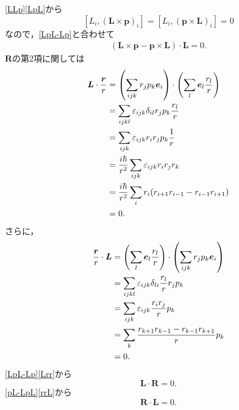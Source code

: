 \eqref{LLp}\eqref{LpL}から
\[[L_i,(\boldsymbol{L}\times\boldsymbol{p})_i]=[L_i,(\boldsymbol{p}\times\boldsymbol{L})_i]=0\]
なので，\eqref{LpL-Lp}と合わせて
\begin{align}
  (\boldsymbol{L}\times\boldsymbol{p} - \boldsymbol{p}\times\boldsymbol{L})\cdot\boldsymbol{L}=0.\label{pL-LpL}
\end{align}
$\boldsymbol{R}$の第2項に関しては
\begin{align}
  \boldsymbol{L}\cdot\frac{\boldsymbol{r}}{r} & = \left(\sum_{ijk}r_jp_k\boldsymbol{e}_i\right)\cdot\left(\sum_l\boldsymbol{e}_l\frac{r_l}{r}\right)\notag\\
  & = \sum_{ijkl}\varepsilon_{ijk}\delta_{il}r_jp_k\frac{r_l}{r}\notag\\
  & = \sum_{ijk}\varepsilon_{ijk}r_ir_jp_k\frac{1}{r}\notag\\
  & = \frac{i\hbar}{r^2}\sum_{ijk}\varepsilon_{ijk}r_ir_jr_k\notag\\
  & = \frac{i\hbar}{r^2}\sum_ir_i(r_{i + 1}r_{i - 1} - r_{i - 1}r_{i + 1})\notag\\
  & = 0.\label{Lrr}
\end{align}
さらに，
\begin{align}
  \frac{\boldsymbol{r}}{r}\cdot\boldsymbol{L} & = \left(\sum_l\boldsymbol{e}_l\frac{r_l}{r}\right)\cdot\left(\sum_{ijk}r_jp_k\boldsymbol{e}_i\right)\notag\\
  & = \sum_{ijkl}\varepsilon_{ijk}\delta_{li}\frac{r_l}{r}r_jp_k\notag\\
  & = \sum_{ijk}\varepsilon_{ijk}\frac{r_ir_j}{r}p_k\notag\\
  & = \sum_k\frac{r_{k + 1}r_{k - 1} - r_{k - 1}r_{k + 1}}{r}p_k\notag\\
  & = 0.\label{rrL}
\end{align}
\eqref{LpL-Lp}\eqref{Lrr}から
\[\boldsymbol{L}\cdot\boldsymbol{R}=0.\]
\eqref{pL-LpL}\eqref{rrL}から
\[\boldsymbol{R}\cdot\boldsymbol{L}=0.\]

